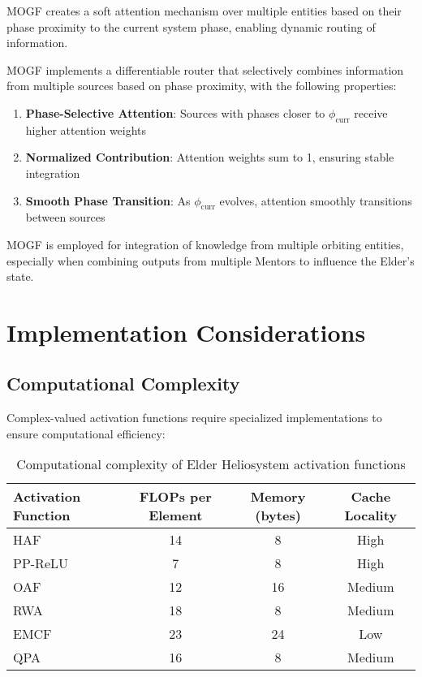 MOGF creates a soft attention mechanism over multiple entities based on their phase proximity to the current system phase, enabling dynamic routing of information.

\begin{theorem}
MOGF implements a differentiable router that selectively combines information from multiple sources based on phase proximity, with the following properties:
\begin{enumerate}
    \item \textbf{Phase-Selective Attention}: Sources with phases closer to $\phi_{\text{curr}}$ receive higher attention weights
    \item \textbf{Normalized Contribution}: Attention weights sum to 1, ensuring stable integration
    \item \textbf{Smooth Phase Transition}: As $\phi_{\text{curr}}$ evolves, attention smoothly transitions between sources
\end{enumerate}
\end{theorem}

MOGF is employed for integration of knowledge from multiple orbiting entities, especially when combining outputs from multiple Mentors to influence the Elder's state.


\section{Implementation Considerations}

\subsection{Computational Complexity}

Complex-valued activation functions require specialized implementations to ensure computational efficiency:

\begin{table}[h]
\centering
\begin{tabular}{|l|c|c|c|}
\hline
\textbf{Activation Function} & \textbf{FLOPs per Element} & \textbf{Memory (bytes)} & \textbf{Cache Locality} \\
\hline
HAF & 14 & 8 & High \\
PP-ReLU & 7 & 8 & High \\
OAF & 12 & 16 & Medium \\
RWA & 18 & 8 & Medium \\
EMCF & 23 & 24 & Low \\
QPA & 16 & 8 & Medium \\
\hline
\end{tabular}
\caption{Computational complexity of Elder Heliosystem activation functions}
\end{table}

